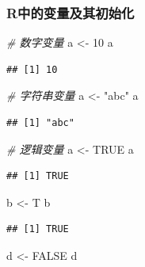 \documentclass[]{article}
\newenvironment{Shaded}{\begin{snugshade}}{\end{snugshade}}
\newcommand{\DecValTok}[1]{\textcolor[rgb]{0.00,0.00,0.81}{{#1}}}
\newcommand{\StringTok}[1]{\textcolor[rgb]{0.31,0.60,0.02}{{#1}}}
\newcommand{\CommentTok}[1]{\textcolor[rgb]{0.56,0.35,0.01}{\textit{{#1}}}}
\newcommand{\OtherTok}[1]{\textcolor[rgb]{0.56,0.35,0.01}{{#1}}}
\newcommand{\NormalTok}[1]{{#1}}
\numberwithin{figure}{section}
\numberwithin{table}{section}
\theoremstyle{definition}
\theoremstyle{definition}
\theoremstyle{definition}
\theoremstyle{remark}
\begin{document}
\subsubsection{R中的变量及其初始化}\label{r}

\begin{Shaded}
\begin{Highlighting}[]
\CommentTok{# 数字变量}
\NormalTok{a <-}\StringTok{ }\DecValTok{10}
\NormalTok{a}
\end{Highlighting}
\end{Shaded}

\begin{verbatim}
## [1] 10
\end{verbatim}

\begin{Shaded}
\begin{Highlighting}[]
\CommentTok{# 字符串变量}
\NormalTok{a <-}\StringTok{ "abc"}
\NormalTok{a}
\end{Highlighting}
\end{Shaded}

\begin{verbatim}
## [1] "abc"
\end{verbatim}

\begin{Shaded}
\begin{Highlighting}[]
\CommentTok{# 逻辑变量}
\NormalTok{a <-}\StringTok{ }\OtherTok{TRUE}
\NormalTok{a}
\end{Highlighting}
\end{Shaded}

\begin{verbatim}
## [1] TRUE
\end{verbatim}

\begin{Shaded}
\begin{Highlighting}[]
\NormalTok{b <-}\StringTok{ }\NormalTok{T}
\NormalTok{b}
\end{Highlighting}
\end{Shaded}

\begin{verbatim}
## [1] TRUE
\end{verbatim}

\begin{Shaded}
\begin{Highlighting}[]
\NormalTok{d <-}\StringTok{ }\OtherTok{FALSE}
\NormalTok{d}
\end{Highlighting}
\end{Shaded}
\end{document}
